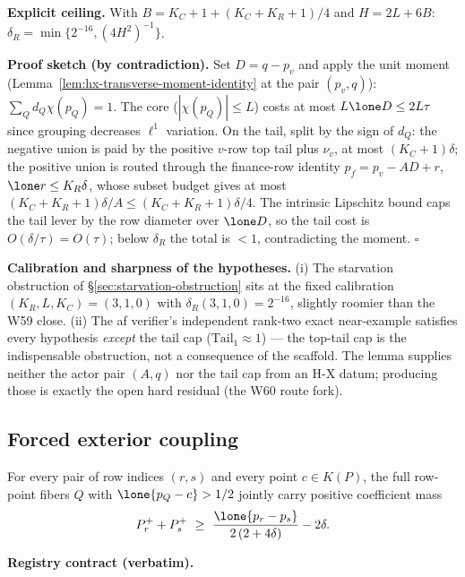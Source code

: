 \noindent\textbf{Explicit ceiling.} With $B=K_C+1+(K_C+K_R+1)/4$ and $H=2L+6B$:
$\delta_R=\min\{2^{-16},(4H^2)^{-1}\}$.

\noindent\textbf{Proof sketch (by contradiction).} Set $D=q-p_v$ and apply the unit
moment (Lemma~\ref{lem:hx-transverse-moment-identity} at the pair $(p_v,q)$):
$\sum_Qd_Q\chi(p_Q)=1$. The core ($|\chi(p_Q)|\le L$) costs at most
$L\lone D\le2L\tau$ since grouping decreases $\ell^1$ variation. On the tail, split
by the sign of $d_Q$: the negative union is paid by the positive $v$-row top tail
plus $\nu_v$, at most $(K_C+1)\delta$; the positive union is routed through the
finance-row identity $p_f=p_v-AD+r$, $\lone r\le K_R\delta$, whose subset budget
gives at most $(K_C+K_R+1)\delta/A\le(K_C+K_R+1)\delta/4$. The intrinsic Lipschitz
bound caps the tail lever by the row diameter over $\lone D$, so the tail cost is
$O(\delta/\tau)=O(\tau)$; below $\delta_R$ the total is $<1$, contradicting the
moment. \hfill$\square$

\noindent\textbf{Calibration and sharpness of the hypotheses.} (i) The
starvation obstruction of \S\ref{sec:starvation-obstruction} sits at the fixed
calibration $(K_R,L,K_C)=(3,1,0)$ with $\delta_R(3,1,0)=2^{-16}$, slightly roomier
than the W59 close. (ii) The af verifier's independent rank-two exact near-example
satisfies every hypothesis \emph{except} the tail cap
($\mathrm{Tail}_1\approx1$) --- the top-tail cap is the indispensable obstruction,
not a consequence of the scaffold. The lemma supplies neither the actor pair
$(A,q)$ nor the tail cap from an H-X datum; producing those is exactly the open
hard residual (the W60 route fork).

\subsection{Forced exterior coupling}

\begin{lemma}\label{lem:hx-forced-exterior-coupling}
For every pair of row indices $(r,s)$ and every point $c\in K(P)$, the full
row-point fibers $Q$ with $\lone{p_Q-c}>1/2$ jointly carry positive coefficient
mass
\[
  P_r^+ + P_s^+\ \ge\ \frac{\lone{p_r-p_s}}{2\,(2+4\delta)}-2\delta .
\]
\end{lemma}

\noindent\textbf{Registry contract (verbatim).}

